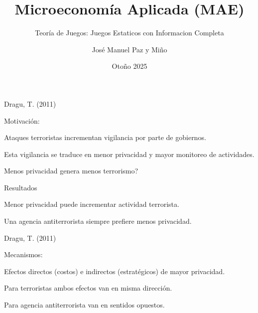 \documentclass[notes, 11pt]{beamer} %
\newenvironment{wideitemize}{\itemize\addtolength{\itemsep}{10pt}}{\enditemize}
\begin{document}
\title{Microeconom\'ia Aplicada (MAE)}   
\subtitle{Teor\'ia de Juegos: Juegos Estaticos con Informacion Completa}   
\author[Paz y Mino ]{Jos\'e Manuel Paz y Mi\~no}
\date{Oto\~no 2025} 

\frame{\titlepage} 



\begin{frame}{Dragu, T. (2011)}
	\begin{wideitemize}
		\item<1-> Motivaci\'on: 
		\begin{wideitemize}
		\item<2->[--] Ataques terroristas incrementan vigilancia por parte de gobiernos.
		\item<3->[--] Esta vigilancia se traduce en menor privacidad y mayor monitoreo de actividades.
		\item<4->[--] Menos privacidad genera menos terrorismo?
		\end{wideitemize}
		\item<5-> Resultados
		\begin{wideitemize}
			\item<6->[--] Menor privacidad puede incrementar actividad terrorista.
			\item<7->[--] Una agencia antiterrorista siempre prefiere menos privacidad.
		\end{wideitemize}
	\end{wideitemize}
\end{frame}

\begin{frame}{Dragu, T. (2011)}
	\begin{wideitemize}
		\item<1-> Mecanismos:
		\begin{wideitemize}
			\item<2-> Efectos directos (costos) e indirectos (estrat\'egicos) de mayor privacidad.
			\item<3-> Para terroristas ambos efectos van en misma direcci\'on.
			\item<4-> Para agencia antiterrorista van en sentidos opuestos.
		\end{wideitemize}

	\end{wideitemize}
\end{frame}





\begin{frame}
\maketitle
\end{frame}
\end{document}
